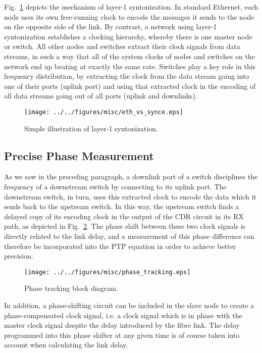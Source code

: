 \documentclass{../JAC2003}
\begin{document}
Fig.~\ref{synce-fig} depicts the mechanism of layer-1
syntonization. In standard Ethernet, each node uses its own
free-running clock to encode the messages it sends to the node on the
opposite side of the link. By contrast, a network using layer-1
syntonization establishes a clocking hierarchy, whereby there is one
master node or switch. All other nodes and switches extract their
clock signals from data streams, in such a way that all of the system
clocks of nodes and switches on the network end up beating at exactly
the same rate. Switches play a key role in this frequency
distribution, by extracting the clock from the data stream going into
one of their ports (uplink port) and using that extracted clock in the
encoding of all data streams going out of all ports (uplink and
downlinks).

\begin{figure}[htb]
   \centering
   \texttt{[image: ../../figures/misc/eth\_vs\_synce.eps]}
   \caption{Simple illustration of layer-1 syntonization.}
   \label{synce-fig}
\end{figure}

\subsection{Precise Phase Measurement}

As we saw in the preceding paragraph, a downlink port of a switch
disciplines the frequency of a downstream switch by connecting to its
uplink port. The downstream switch, in turn, uses this extracted clock
to encode the data which it sends back to the upstream switch. In this
way, the upstream switch finds a delayed copy of its encoding clock in
the output of the CDR circuit in its RX path, as depicted in
Fig.~\ref{phase-tracking-fig}. The phase shift between these two clock
signals is directly related to the link delay, and a measurement of
this phase difference can therefore be incorporated into the PTP
equation in order to achieve better precision. 

\begin{figure}[htb]
   \centering
   \texttt{[image: ../../figures/misc/phase\_tracking.eps]}
   \caption{Phase tracking block diagram.}
   \label{phase-tracking-fig}
\end{figure}

In addition, a phase-shifting circuit can be included in the slave
node to create a phase-compensated clock signal, i.e. a clock signal
which is in phase with the master clock signal despite the delay
introduced by the fibre link. The delay programmed into this phase
shifter at any given time is of course taken into account when
calculating the link delay.
\end{document}
